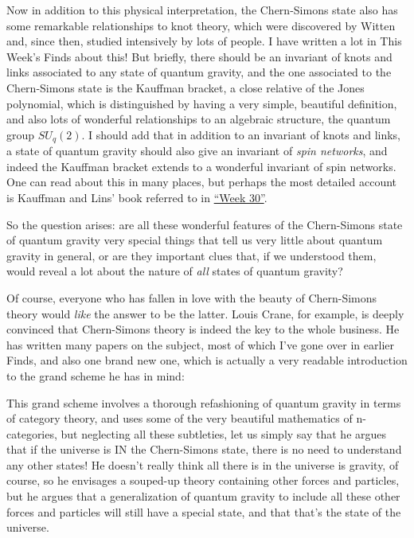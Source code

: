 \documentclass{article}
\def\tightlist{}
\renewcommand{\texttt}[1]{%
  \begingroup
  \ttfamily
  \begingroup\lccode`~=`/\lowercase{\endgroup\def~}{/\discretionary{}{}{}}%
  \begingroup\lccode`~=`[\lowercase{\endgroup\def~}{[\discretionary{}{}{}}%
  \begingroup\lccode`~=`.\lowercase{\endgroup\def~}{.\discretionary{}{}{}}%
  \catcode`/=\active\catcode`[=\active\catcode`.=\active
  \scantokens{#1\noexpand}%
  \endgroup
}
\begin{document}
Now in addition to this physical interpretation, the Chern-Simons state
also has some remarkable relationships to knot theory, which were
discovered by Witten and, since then, studied intensively by lots of
people. I have written a lot in This Week's Finds about this! But
briefly, there should be an invariant of knots and links associated to
any state of quantum gravity, and the one associated to the Chern-Simons
state is the Kauffman bracket, a close relative of the Jones polynomial,
which is distinguished by having a very simple, beautiful definition,
and also lots of wonderful relationships to an algebraic structure, the
quantum group \(SU_q(2)\). I should add that in addition to an invariant
of knots and links, a state of quantum gravity should also give an
invariant of \emph{spin networks}, and indeed the Kauffman bracket
extends to a wonderful invariant of spin networks. One can read about
this in many places, but perhaps the most detailed account is Kauffman
and Lins' book referred to in \protect\hyperlink{week30}{``Week 30''}.

So the question arises: are all these wonderful features of the
Chern-Simons state of quantum gravity very special things that tell us
very little about quantum gravity in general, or are they important
clues that, if we understood them, would reveal a lot about the nature
of \emph{all} states of quantum gravity?

Of course, everyone who has fallen in love with the beauty of
Chern-Simons theory would \emph{like} the answer to be the latter. Louis
Crane, for example, is deeply convinced that Chern-Simons theory is
indeed the key to the whole business. He has written many papers on the
subject, most of which I've gone over in earlier Finds, and also one
brand new one, which is actually a very readable introduction to the
grand scheme he has in mind:


This grand scheme involves a thorough refashioning of quantum gravity in
terms of category theory, and uses some of the very beautiful
mathematics of n-categories, but neglecting all these subtleties, let us
simply say that he argues that if the universe is IN the Chern-Simons
state, there is no need to understand any other states! He doesn't
really think all there is in the universe is gravity, of course, so he
envisages a souped-up theory containing other forces and particles, but
he argues that a generalization of quantum gravity to include all these
other forces and particles will still have a special state, and that
that's the state of the universe.
\end{document}
